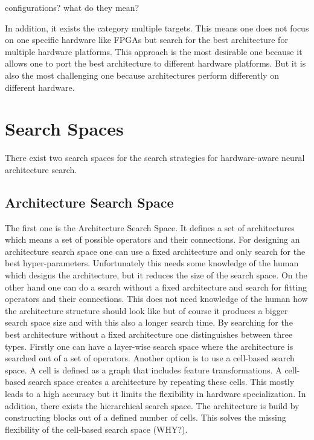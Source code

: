 \documentclass[conference]{IEEEtran}
\begin{document}
configurations? what do they mean?

In addition, it exists the category multiple targets. This means one does not focus on one specific hardware like FPGAs but search for the best architecture for multiple hardware platforms. This approach is the most desirable one because it allows one to port the best architecture to different hardware platforms. But it is also the most challenging one because architectures perform differently on different hardware. 

\section{Search Spaces}

There exist two search spaces for the search strategies for hardware-aware neural architecture search. 

\subsection{Architecture Search Space}

The first one is the Architecture Search Space. It defines a set of architectures which means a set of possible operators and their connections. For designing an architecture search space one can use a fixed architecture and only search for the best hyper-parameters. Unfortunately this needs some knowledge of the human which designs the architecture, but it reduces the size of the search space. On the other hand one can do a search without a fixed architecture and search for fitting operators and their connections. This does not need knowledge of the human how the architecture structure should look like but of course it produces a bigger search space size and with this also a longer search time. By searching for the best architecture without a fixed architecture one distinguishes between three types. Firstly one can have a layer-wise search space where the architecture is searched out of a set of operators. Another option is to use a cell-based search space. A cell is defined as a graph that includes feature transformations. A cell-based search space creates a architecture by repeating these cells. This mostly leads to a high accuracy but it limits the flexibility in hardware specialization. In addition, there exists the hierarchical search space. The architecture is build by constructing blocks out of a defined number of cells. This solves the missing flexibility of the cell-based search space (WHY?). 
\end{document}
